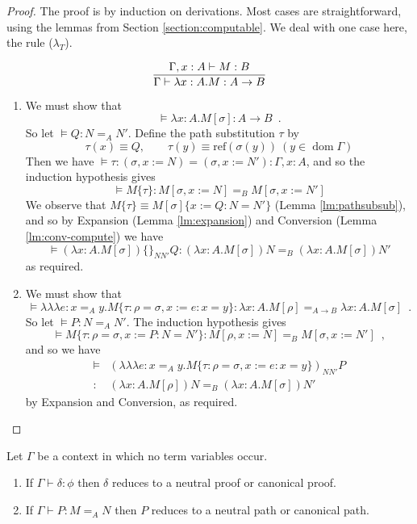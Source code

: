 \documentclass[a4paper,UKenglish]{lipics-v2016}
\newcommand*{\reff}[1]{\ensuremath{\mathrm{ref} \left( {#1} \right)}}
\newcommand*{\triplelambda}{\ensuremath{\lambda \!\! \lambda \!\! \lambda}}
\newcommand*{\dom}{\ensuremath{\operatorname{dom}}}
\theoremstyle{plain}
\theoremstyle{definition}
\begin{document}
\begin{proof}
The proof is by induction on derivations.  Most cases are straightforward, using the lemmas from
Section \ref{section:computable}.  We deal with one case here, the rule ($\lambda_T$).

$$ \infer{\Gamma \vdash \lambda x:A.M : A \rightarrow B}{\Gamma, x : A \vdash M : B} $$

\begin{enumerate}
\item
We must show that
$$ \models \lambda x:A.M[\sigma] : A \rightarrow B \enspace . $$
So let $\models Q : N =_A N'$.  Define the path substitution $\tau$ by
$$ \tau(x) \equiv Q, \qquad \tau(y) \equiv \reff{\sigma(y)} \ (y \in \dom \Gamma) $$
Then we have $\models \tau : (\sigma, x:=N) = (\sigma, x:=N') : \Gamma , x : A$, and so the induction hypothesis gives
$$ \models M \{ \tau \} : M[\sigma, x:=N] =_B M [ \sigma, x:= N' ] $$
We observe that $M \{ \tau \} \equiv M [ \sigma ] \{ x:=Q:N=N' \}$ (Lemma \ref{lm:pathsubsub}),
and so by Expansion (Lemma \ref{lm:expansion}) and Conversion (Lemma \ref{lm:conv-compute}) we have
$$ \models (\lambda x:A.M[\sigma])\{\}_{N N'} Q : (\lambda x:A.M[\sigma])N =_B (\lambda x:A.M[\sigma])N' $$
as required.
\item
We must show that
$$  \models \triplelambda e : x =_A y. M \{ \tau : \rho = \sigma, x := e : x = y \} : \lambda x:A.M [ \rho ] =_{A \rightarrow B} \lambda x:A.M [ \sigma ] \enspace . $$
So let $ \models P : N =_A N'$.  The induction hypothesis gives
$$  \models M \{ \tau : \rho = \sigma, x := P : N = N' \} : M [\rho, x := N] =_B M [\sigma, x := N'] \enspace , $$
and so we have
\begin{align*}
\models & (\triplelambda e : x =_A y. M \{ \tau : \rho = \sigma, x := e : x = y \})_{N N'} P \\
: & (\lambda x:A.M [ \rho ])N =_B (\lambda x:A.M [ \sigma ])N'
\end{align*}
by Expansion and Conversion, as required.
\end{enumerate}
\end{proof}

\begin{corollary}
Let $\Gamma$ be a context in which no term variables occur.
\begin{enumerate}
\item
If $\Gamma \vdash \delta : \phi$ then $\delta$ reduces to a neutral proof or canonical proof.
\item
If $\Gamma \vdash P : M =_A N$ then $P$ reduces to a neutral path or canonical path.
\end{enumerate}
\end{corollary}
\end{document}
